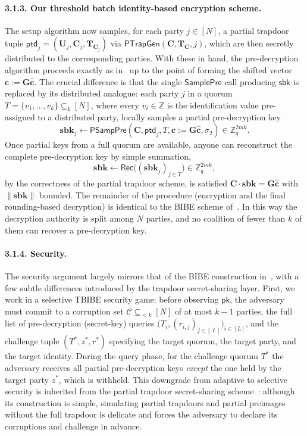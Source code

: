 \paragraph{3.1.3. Our threshold batch identity-based encryption scheme.}
The setup algorithm now samples, for each party $j\in[N]$, a partial trapdoor tuple
$\mathsf{ptd}_j = (\mathbf{U}_j, \mathbf{C}_j, \mathbf{T}_{\mathbf{C}_j})$ via
$\mathsf{PTrapGen}(\mathbf{C}, \mathbf{T}_{\mathbf{C}}, j)$, which are then secretly
distributed to the corresponding parties. With these in hand, the pre-decryption
algorithm proceeds exactly as in~\cite{EPRINT:BonLauTas25} up to the point of
forming the shifted vector $\mathbf{c} := \mathbf{G}\hat{\mathbf{c}}$. The crucial
difference is that the single $\mathsf{SamplePre}$ call producing $\mathsf{sbk}$ is
replaced by its distributed analogue: each party $j$ in a quorum
$T = \{v_1,\dots,v_k\} \subseteq_k [N]$, where every $v_i\in\mathbb{Z}$ is the
identification value pre-assigned to a distributed party, locally samples a partial
pre-decryption key
\[
  \mathbf{sbk}_j \leftarrow \mathsf{PSampPre}(\mathbf{C}, \mathsf{ptd}_j, T,
  \mathbf{c} := \mathbf{G}\hat{\mathbf{c}}, \sigma_2) \in \mathbb{Z}_q^{2mk}.
\]
Once partial keys from a full quorum are available, anyone can reconstruct the
complete pre-decryption key by simple summation,
\[
  \mathbf{sbk} \leftarrow \mathsf{Rec}\big((\mathbf{sbk}_j)_{j \in T}\big)
  \in \mathbb{Z}_q^{2mk},
\]
by the correctness of the partial trapdoor scheme, is satisfied
$\mathbf{C}\cdot\mathbf{sbk} = \mathbf{G}\hat{\mathbf{c}}$ with $\|\mathbf{sbk}\|$
bounded. The remainder of the procedure (encryption and the final rounding-based
decryption) is identical to the BIBE scheme of~\cite{EPRINT:BonLauTas25}. In this
way the decryption authority is split among $N$ parties, and no coalition of fewer
than $k$ of them can recover a pre-decryption key.

\paragraph{3.1.4. Security.}
The security argument largely mirrors that of the BIBE construction
in~\cite{EPRINT:BonLauTas25}, with a few subtle differences introduced by the
trapdoor secret-sharing layer. First, we work in a selective
TBIBE security game: before observing $\mathsf{pk}$, the adversary must commit to a
corruption set $\mathcal{C}\subseteq_{<k}[N]$ of at most $k-1$ parties, the full
list of pre-decryption (secret-key) queries
$\big(T_i,(r_{i,j})_{j\in[\ell]}\big)_{i\in[L]}$, and the challenge tuple
$(T^\ast, z^\ast, r^\ast)$ specifying the target quorum, the target party, and the
target identity. During the query phase, for the challenge quorum $T^\ast$ the
adversary receives all partial pre-decryption keys \emph{except} the one held by
the target party $z^\ast$, which is withheld. This downgrade from adaptive to selective security is inherited from the partial trapdoor secret-sharing
scheme~\cite{AC:ALLW25}: although its construction is simple, simulating partial
trapdoors and partial preimages without the full trapdoor is delicate and forces
the adversary to declare its corruptions and challenge in advance.

